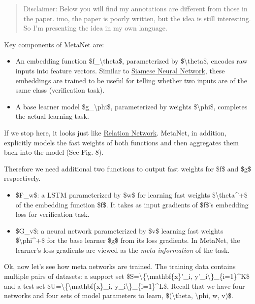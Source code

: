 \begin{quote}
Disclaimer: Below you will find my annotations are different from those in the paper. imo, the paper is poorly written, but the idea is still interesting. So I'm presenting the idea in my own language.
\end{quote}

Key components of MetaNet are:

\begin{itemize}
\tightlist
\item
  An embedding function \$f\_\textbackslash theta\$, parameterized by \$\textbackslash theta\$, encodes raw inputs into feature vectors. Similar to \hyperref[convolutional-siamese-neural-network]{Siamese Neural Network}, these embeddings are trained to be useful for telling whether two inputs are of the same class (verification task).
\item
  A base learner model \$g\_\textbackslash phi\$, parameterized by weights \$\textbackslash phi\$, completes the actual learning task.
\end{itemize}

If we stop here, it looks just like \hyperref[relation-network]{Relation Network}. MetaNet, in addition, explicitly models the fast weights of both functions and then aggregates them back into the model (See Fig. 8).

Therefore we need additional two functions to output fast weights for \$f\$ and \$g\$ respectively.

\begin{itemize}
\tightlist
\item
  \$F\_w\$: a LSTM parameterized by \$w\$ for learning fast weights \$\textbackslash theta\^{}+\$ of the embedding function \$f\$. It takes as input gradients of \$f\$'s embedding loss for verification task.
\item
  \$G\_v\$: a neural network parameterized by \$v\$ learning fast weights \$\textbackslash phi\^{}+\$ for the base learner \$g\$ from its loss gradients. In MetaNet, the learner's loss gradients are viewed as the \emph{meta information} of the task.
\end{itemize}

Ok, now let's see how meta networks are trained. The training data contains multiple pairs of datasets: a support set \$S=\textbackslash\{\textbackslash mathbf\{x\}'\_i, y'\_i\textbackslash\}\_\{i=1\}\^{}K\$ and a test set \$U=\textbackslash\{\textbackslash mathbf\{x\}\_i, y\_i\textbackslash\}\_\{i=1\}\^{}L\$. Recall that we have four networks and four sets of model parameters to learn, \$(\textbackslash theta, \textbackslash phi, w, v)\$.

